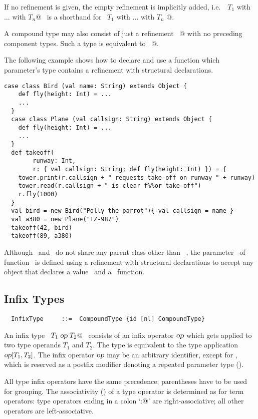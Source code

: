 If no refinement is given, the empty refinement is implicitly added,
i.e.\  ~\lstinline@$T_1$ with $\ldots$ with $T_n$@~ is a shorthand for
~\lstinline@$T_1$ with $\ldots$ with $T_n$ {}@.

A compound type may also consist of just a refinement
~@ with no preceding component types. Such a type is
equivalent to ~@.

\example The following example shows how to declare and use a function which parameter's type contains a refinement with structural declarations.
\begin{lstlisting}[escapechar=\%]
  case class Bird (val name: String) extends Object {
  	def fly(height: Int) = ...
	...
  }
  case class Plane (val callsign: String) extends Object {
  	def fly(height: Int) = ...
	...
  }
  def takeoff(
  	    runway: Int,
        r: { val callsign: String; def fly(height: Int) }) = {
    tower.print(r.callsign + " requests take-off on runway " + runway)
    tower.read(r.callsign + " is clear f%%or take-off")
    r.fly(1000)
  }
  val bird = new Bird("Polly the parrot"){ val callsign = name }
  val a380 = new Plane("TZ-987")
  takeoff(42, bird)
  takeoff(89, a380)
\end{lstlisting}
Although ~\lstinline@Bird@ and ~\lstinline@Plane@ do not share any parent class other than ~\lstinline@Object@, the parameter ~\lstinline@r@ of function ~\lstinline@takeoff@ is defined using a refinement with structural declarations to accept any object that declares a value ~\lstinline@callsign@ and a ~\lstinline@fly@ function.

 
\subsection{Infix Types}\label{sec:infix-types}

\syntax\begin{lstlisting}
  InfixType     ::=  CompoundType {id [nl] CompoundType}
\end{lstlisting}
An infix type ~\lstinline@$T_1\;\mbox{\sl op}\;T_2$@~ consists of an infix
operator $\mbox{\sl op}$ which gets applied to two type operands $T_1$ and
$T_2$.  The type is equivalent to the type application $\mbox{\sl op}[T_1,
T_2]$.  The infix operator $\mbox{\sl op}$ may be an arbitrary identifier,
except for \code{*}, which is reserved as a postfix modifier 
denoting a repeated parameter type (). 

All type infix operators have the same precedence; parentheses have to
be used for grouping. The associativity ()
of a type operator is determined as for term operators: type operators
ending in a colon `\lstinline@:@' are right-associative; all other
operators are left-associative.

